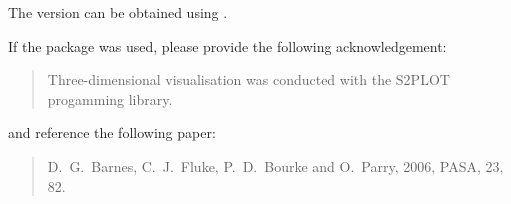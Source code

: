 \documentclass{article}
\begin{document}

The version can be obtained using .  


If the  package was used, please provide the following
acknowledgement:

\begin{quotation}
  Three-dimensional visualisation was conducted with the S2PLOT
   progamming library.
\end{quotation}

and reference the following paper:

\begin{quotation}
  D.~G.~Barnes, C.~J.~Fluke, P.~D.~Bourke and O.~Parry, 2006, PASA, 23, 82.
\end{quotation}
\end{document}
